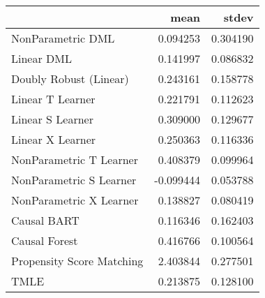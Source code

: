 \begin{tabular}{lrr}
\toprule
{} &      mean &     stdev \\
\midrule
NonParametric DML         &  0.094253 &  0.304190 \\
Linear DML                &  0.141997 &  0.086832 \\
Doubly Robust (Linear)    &  0.243161 &  0.158778 \\
Linear T Learner          &  0.221791 &  0.112623 \\
Linear S Learner          &  0.309000 &  0.129677 \\
Linear X Learner          &  0.250363 &  0.116336 \\
NonParametric T Learner   &  0.408379 &  0.099964 \\
NonParametric S Learner   & -0.099444 &  0.053788 \\
NonParametric X Learner   &  0.138827 &  0.080419 \\
Causal BART               &  0.116346 &  0.162403 \\
Causal Forest             &  0.416766 &  0.100564 \\
Propensity Score Matching &  2.403844 &  0.277501 \\
TMLE                      &  0.213875 &  0.128100 \\
\bottomrule
\end{tabular}
